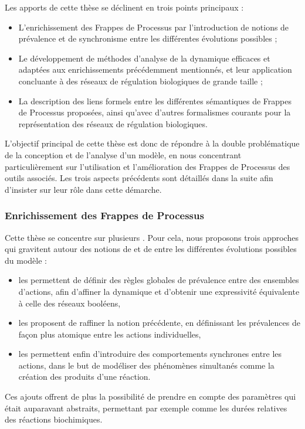 Les apports de cette thèse se déclinent en trois points principaux :
\begin{itemize}
  \item L'enrichissement des Frappes de Processus par l'introduction de notions
    de prévalence et de synchronisme entre les différentes évolutions possibles ;
  \item Le développement de méthodes d'analyse de la dynamique efficaces
    et adaptées aux enrichissements précédemment mentionnés,
    et leur application concluante à des réseaux de régulation biologiques de grande taille ;
  \item La description des liens formels entre les différentes sémantiques de Frappes de Processus
    proposées, ainsi qu'avec d'autres formalismes courants pour la représentation
    des réseaux de régulation biologiques.
\end{itemize}
L'objectif principal de cette thèse est donc de répondre à la double problématique
de la conception et de l'analyse d'un modèle,
en nous concentrant particulièrement sur l'utilisation et l'amélioration
des Frappes de Processus des outils associés.
Les trois aspects précédents sont détaillés dans la suite
afin d'insister sur leur rôle dans cette démarche.

\subsubsection{Enrichissement des Frappes de Processus}

Cette thèse se concentre sur plusieurs .
Pour cela, nous proposons trois approches qui gravitent autour des notions
de  et de  entre les différentes
évolutions possibles du modèle :
\begin{itemize}
  \item les  permettent de définir des règles globales de prévalence
    entre des ensembles d'actions, afin d'affiner la dynamique et d'obtenir une expressivité
    équivalente à celle des réseaux booléens,
  \item les  proposent de raffiner la notion précédente,
    en définissant les prévalences de façon plus atomique entre les actions individuelles,
  \item les  permettent enfin d'introduire des comportements
    synchrones entre les actions, dans le but de modéliser des phénomènes simultanés
    comme la création des produits d'une réaction.
\end{itemize}
Ces ajouts offrent de plus la possibilité de prendre en compte des paramètres qui était
auparavant abstraits,
permettant par exemple 
comme les durées relatives des réactions biochimiques.

